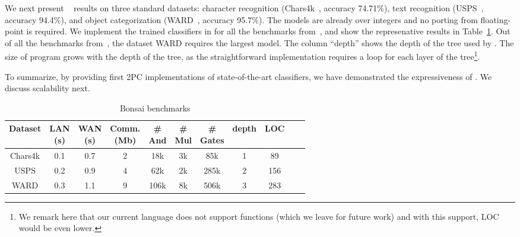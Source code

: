 We next present \bonsai~\cite{bonsai} results on three
standard datasets: character recognition (Chars4k~\cite{campos},
accuracy 74.71\%), text recognition (USPS~\cite{hull}, accuracy
94.4\%), and object categorization (WARD~\cite{yang}, accuracy
95.7\%). 
The \bonsai models are already over integers and no porting from
floating-point is required.
We implement the trained classifiers in \tool for all the benchmarks
from~\cite{bonsai},
and show the represenative results in Table~\ref{tab:bonsai}.
Out of all the benchmarks from~\cite{bonsai}, the dataset WARD
requires the largest model. 
The column ``depth''  shows the depth of the
tree used by \bonsai. The size of \tool 
program grows with the depth of the tree, as the straightforward \tool
implementation requires a loop for each layer of the
tree\footnote{We remark here that our current language does not support functions (which we leave for future work) and with this support, LOC would be even lower.}.

To summarize, by providing first 2PC implementations of
state-of-the-art classifiers, we have demonstrated the expressiveness
of \tool. We discuss scalability next.

\setlength\tabcolsep{4pt}
\begin{table}
\begin{tabular}{c|c|c|c |c|c|c|c|c|c | c}
Dataset       & \thead{LAN \\(s)} & \thead{WAN \\(s)} & \thead{Comm. \\ (Mb)}  & \thead{\#\\And} & \thead{\#\\Mul} & \thead{\#\\Gates} & depth & LOC\\
\hline
Chars4k    &  0.1         & 0.7         & 2            & 18k    & 3k    &  85k     & 1   & 89\\
\hline
USPS       &  0.2         & 0.9         & 4            & 62k    & 2k    &  285k    & 2   & 156\\
\hline
WARD       &  0.3         & 1.1         & 9            & 106k    & 8k    &  506k    & 3   & 283\\
\hline
\end{tabular}

 \caption{Bonsai benchmarks}
 \label{tab:bonsai} 
\end{table}
\setlength\tabcolsep{6pt}
